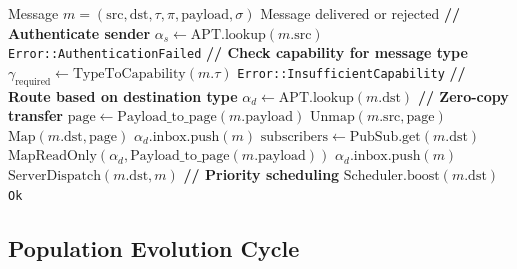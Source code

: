 \documentclass{article}
\begin{document}
\begin{algorithm}[t]
\caption{IPC Message Routing}
\label{alg:ipc}
\begin{algorithmic}[1]
\REQUIRE Message $m = (\text{src}, \text{dst}, \tau, \pi, \text{payload}, \sigma)$
\ENSURE Message delivered or rejected
\STATE \textbf{// Authenticate sender}
\STATE $\alpha_s \leftarrow \text{APT}.\text{lookup}(m.\text{src})$
    \RETURN \texttt{Error::AuthenticationFailed}
\ENDIF
\STATE \textbf{// Check capability for message type}
\STATE $\gamma_{\text{required}} \leftarrow \text{TypeToCapability}(m.\tau)$
    \RETURN \texttt{Error::InsufficientCapability}
\ENDIF
\STATE \textbf{// Route based on destination type}
    \STATE $\alpha_d \leftarrow \text{APT}.\text{lookup}(m.\text{dst})$
    \STATE \textbf{// Zero-copy transfer}
    \STATE $\text{page} \leftarrow \text{Payload\_to\_page}(m.\text{payload})$
    \STATE $\text{Unmap}(m.\text{src}, \text{page})$
    \STATE $\text{Map}(m.\text{dst}, \text{page})$
    \STATE $\alpha_d.\text{inbox}.\text{push}(m)$
    \STATE $\text{subscribers} \leftarrow \text{PubSub}.\text{get}(m.\text{dst})$
        \STATE $\text{MapReadOnly}(\alpha_d, \text{Payload\_to\_page}(m.\text{payload}))$
        \STATE $\alpha_d.\text{inbox}.\text{push}(m)$
    \ENDFOR
{}
    \STATE $\text{ServerDispatch}(m.\text{dst}, m)$
\ENDIF
\STATE \textbf{// Priority scheduling}
    \STATE $\text{Scheduler}.\text{boost}(m.\text{dst})$
\ENDIF
\RETURN \texttt{Ok}
\end{algorithmic}
\end{algorithm}

\subsection{Population Evolution Cycle}
\end{document}
